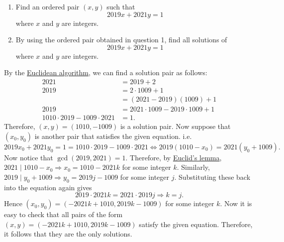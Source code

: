 \begin{question}
    \begin{enumerate}
        \item Find an ordered pair $(x,y)$ such that \[2019x + 2021y = 1\]
            where $x$ and $y$ are integers. 

        \item By using the ordered pair obtained in question 1, find all
            solutions of \[2019x + 2021y = 1\] where $x$ and $y$ are integers. 
    \end{enumerate}
\end{question}
\begin{solution}
    By the \hyperref[teq: euclideanalg]{Euclidean algorithm}, we can find a
    solution pair as follows:
    \begin{align*}
        2021 &= 2019 + 2\\
        2019 &= 2 \cdot 1009 + 1\\
        &= (2021 - 2019)(1009) + 1\\
        2019 &= 2021 \cdot 1009 - 2019 \cdot 1009 + 1\\
        1010 \cdot 2019 - 1009 \cdot 2021 &= 1.
    \end{align*}
    Therefore, $(x, y) = (1010, -1009)$ is a solution pair. Now suppose that
    $(x_0, y_0)$ is another pair that satisfies the given equation. i.e.
    \[ 2019x_0 + 2021y_0 = 1 = 1010 \cdot 2019 - 1009 \cdot 2021
    \Longleftrightarrow 2019(1010 - x_0) = 2021(y_0 + 1009). \]
    Now notice that $\gcd(2019, 2021) = 1$. Therefore, by \hyperref[lem:
    euclid]{Euclid's lemma}, $2021 \mid 1010 - x_0 \Rightarrow x_0 = 1010 -
    2021k$ for some integer $k$. Similarly, $2019 \mid y_0 + 1009 \Rightarrow
    y_0 = 2019j - 1009$ for some integer $j$. Substituting these back into the
    equation again gives
    \[ 2019 \cdot 2021 k = 2021 \cdot 2019 j \Longrightarrow k = j. \]
    Hence $(x_0, y_0) = (-2021k + 1010, 2019k - 1009)$ for some integer $k$.
    Now it is easy to check that all pairs of the form $(x, y) = (-2021k +
    1010, 2019k - 1009)$ satisfy the given equation. Therefore, it follows that
    they are the only solutions.
\end{solution}

